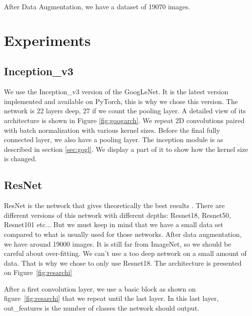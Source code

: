 After Data Augmentation, we have a dataset of 19070 images. 


\section{Experiments}
\subsection{Inception\_v3}
We use the Inception\_v3 version of the GoogLeNet. It is the latest version implemented and available on PyTorch, this is why we chose this version. The network is 22 layers deep, 27 if we count the pooling layer. A detailed view of its architecture is shown in Figure \ref{fig:googarch}.
We repeat 2D convolutions paired with batch normalization with various kernel sizes. Before the final fully connected layer, we also have a pooling layer. The inception module is as described in section \ref{sec:gogl}. We display a part of it to show how the kernel size is changed.  
\subsection{ResNet}
ResNet is the network that gives theoretically the best results \cite{resnetpaper}. There are different versions of this network with different depths: Resnet18, Resnet50, Resnet101 etc... But we must keep in mind that we have a small data set compared to what is usually used for those networks. After data augmentation, we have around 19000 images. It is still far from ImageNet, so we should be careful about over-fitting. We can't use a too deep network on a small amount of data. That is why we chose to only use Resnet18. The architecture is presented on Figure~\ref{fig:resarchi}

After a first convolution layer, we use a basic block as shown on figure~\ref{fig:resarchi} that we repeat until the last layer. In this last layer, out\_features is the number of classes the network should output. 
